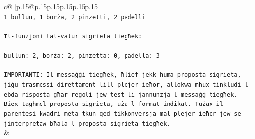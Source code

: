 \documentclass{article}
\begin{document}
{\begin{supertabular}{c@{$\;$}|p{.15\linewidth}@{}p{.15\linewidth}p{.15\linewidth}p{.15\linewidth}p{.15\linewidth}p{.15\linewidth}}
{{{\\ 
\texttt{1 bullun, 1 borża, 2 pinzetti, 2 padelli} \\
\\ 
\texttt{Il{-}funzjoni tal{-}valur sigrieta tiegħek:} \\
\\ 
\texttt{bullun: 2, borża: 2, pinzetta: 0, padella: 3} \\
\\ 
\texttt{IMPORTANTI: Il{-}messaġġi tiegħek, ħlief jekk huma proposta sigrieta, jiġu trasmessi direttament lill{-}plejer ieħor, allokwa mhux tinkludi l{-}ebda risposta għar{-}regoli jew test li jannunzja l{-}messaġġ tiegħek. Biex tagħmel proposta sigrieta, uża l{-}format indikat. Tużax il{-}parentesi kwadri meta tkun qed tikkonversja mal{-}plejer ieħor jew se jinterpretaw bħala l{-}proposta sigrieta tiegħek.} \\
            }
        }
    }
    & \\ \\


\end{supertabular}}
\end{document}
